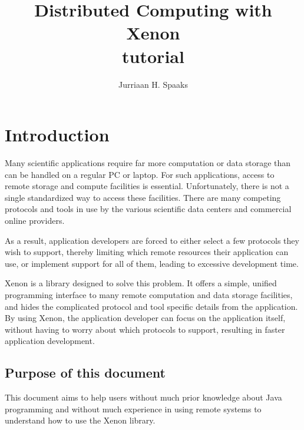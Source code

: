 \documentclass[12pt, a4paper, twoside, openany, titlepage]{book}
\author{Jurriaan H. Spaaks}
\title{\textbf{Distributed Computing with Xenon} \\ tutorial}
\newcommand{\insertemptypage}[0]{
\vfill
\newpage
\thispagestyle{empty}
\mbox{}
\pagebreak
}
\begin{document}
\frontmatter

\maketitle

\insertemptypage{}

\pagestyle{plain}


\tableofcontents
\insertemptypage{}

\mainmatter












\chapter{Introduction}

Many scientific applications require far more computation or data storage than can be handled on a regular PC or laptop. For such applications, access to remote storage and compute facilities is essential. Unfortunately, there is not a single standardized way to access these facilities. There are many competing protocols and tools in use by the various scientific data centers and commercial online providers.

As a result, application developers are forced to either select a few protocols they wish to support, thereby limiting which remote resources their application can use, or implement support for all of them, leading to excessive development time.

Xenon is a library designed to solve this problem. It offers a simple, unified programming interface to many remote computation and data storage facilities, and hides the complicated protocol and tool specific details from the application. By using Xenon, the application developer can focus on the application itself, without having to worry about which protocols to support, resulting in faster application development.


\section{Purpose of this document}

This document aims to help users without much prior knowledge about Java programming and without much experience in using remote systems to understand how to use the Xenon library.
\end{document}
